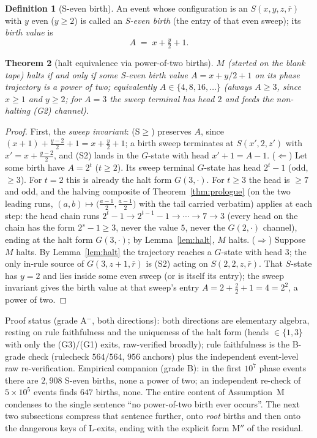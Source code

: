 \documentclass[11pt]{amsart}
\newtheorem{theorem}{Theorem}[section]
\theoremstyle{definition}
\newtheorem{definition}[theorem]{Definition}
\begin{document}
\begin{definition}[S-even birth]\label{def:birth}
An event whose configuration is an $S(x,y,z,\overline r)$ with $y$ even
($y\ge2$) is called an \emph{S-even birth} (the entry of that even sweep);
its \emph{birth value} is
\[
A \;=\; x+\tfrac{y}{2}+1 .
\]
\end{definition}

\begin{theorem}[halt equivalence via power-of-two births]\label{thm:haltpow}
$M$ (started on the blank tape) halts if and only if some S-even birth value
$A=x+y/2+1$ on its phase trajectory is a power of two; equivalently
$A\in\{4,8,16,\dots\}$ (always $A\ge3$, since $x\ge1$ and $y\ge2$; for $A=3$
the sweep terminal has head $2$ and feeds the non-halting (G2) channel).
\end{theorem}
\begin{proof}
First, the \emph{sweep invariant}: (S$\ge$) preserves $A$, since
$(x{+}1)+\frac{y-2}{2}+1=x+\frac y2+1$; a birth sweep terminates at
$S(x',2,z')$ with $x'=x+\frac{y-2}{2}$, and (S2) lands in the $G$-state with
head $x'{+}1=A-1$.
($\Leftarrow$) Let some birth have $A=2^{t}$ ($t\ge2$). Its sweep terminal
$G$-state has head $2^{t}-1$ (odd, $\ge3$). For $t=2$ this is already the
halt form $G(3,\cdot)$. For $t\ge3$ the head is $\ge7$ and odd, and the
halving composite of Theorem~\ref{thm:prologue} (on the two leading runs,
$(a,b)\mapsto\bigl(\frac{a-1}{2},\frac{a-1}{2}\bigr)$ with the tail carried
verbatim) applies at each step: the head chain runs
$2^{t}-1\to2^{t-1}-1\to\cdots\to7\to3$ (every head on the chain has the form
$2^{s}-1\ge3$, never the value $5$, never the $G(2,\cdot)$ channel), ending
at the halt form $G(3,\cdot)$; by Lemma~\ref{lem:halt}, $M$ halts.
($\Rightarrow$) Suppose $M$ halts. By Lemma~\ref{lem:halt} the trajectory
reaches a $G$-state with head $3$; the only in-rule source of
$G(3,z{+}1,\overline r)$ is (S2) acting on $S(2,2,z,\overline r)$. That
$S$-state has $y=2$ and lies inside some even sweep (or is itself its entry);
the sweep invariant gives the birth value at that sweep's entry
$A=2+\frac22+1=4=2^{2}$, a power of two.
\end{proof}

Proof status (grade A$^-$, both directions): both directions are elementary
algebra, resting on rule faithfulness and the uniqueness of the halt form
(heads $\in\{1,3\}$ with only the (G3)/(G1) exits, raw-verified broadly);
rule faithfulness is the B-grade check (rulecheck $564/564$, $956$ anchors)
plus the independent event-level raw re-verification. Empirical companion
(grade B): in the first $10^{7}$ phase events there are $2{,}908$ S-even
births, none a power of two; an independent re-check of $5\times10^{5}$
events finds $647$ births, none. The entire content of Assumption~M condenses
to the single sentence ``no power-of-two birth ever occurs''. The next two
subsections compress that sentence further, onto \emph{root} births and then
onto the dangerous keys of L-exits, ending with the explicit form
$\mathrm{M''}$ of the residual.
\end{document}
